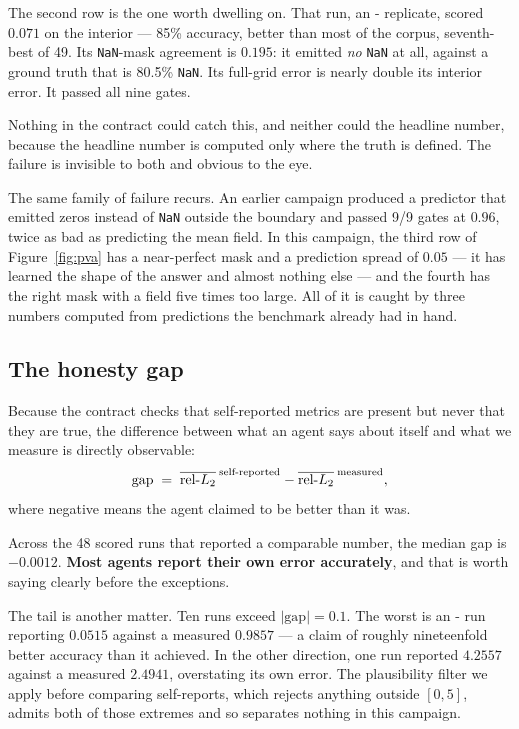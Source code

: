 The second row is the one worth dwelling on. That run, an \Lthree{}-
replicate, scored \relltwo{} $0.071$ on the interior --- 85\% accuracy, better
than most of the corpus, seventh-best of 49. Its \texttt{NaN}-mask agreement is
$0.195$: it emitted \emph{no} \texttt{NaN} at all, against a ground truth that
is 80.5\% \texttt{NaN}. Its full-grid error is nearly double its interior
error. It passed all nine gates.

Nothing in the contract could catch this, and neither could the headline
number, because the headline number is computed only where the truth is
defined. The failure is invisible to both and obvious to the eye.

The same family of failure recurs. An earlier campaign produced a predictor
that emitted zeros instead of \texttt{NaN} outside the boundary and passed 9/9
gates at \relltwo{} $0.96$, twice as bad as predicting the mean field. In this
campaign, the third row of Figure~\ref{fig:pva} has a near-perfect mask and a
prediction spread of $0.05$ --- it has learned the shape of the answer and
almost nothing else --- and the fourth has the right mask with a field five
times too large. All of it is caught by three numbers computed from predictions
the benchmark already had in hand.

\subsection{The honesty gap}
\label{sec:honesty}

Because the contract checks that self-reported metrics are present but never
that they are true, the difference between what an agent says about itself and
what we measure is directly observable:
\begin{equation}
  \mathrm{gap} \;=\;
  \overline{\mbox{rel-$L_2$}}^{\;\text{self-reported}} -
  \overline{\mbox{rel-$L_2$}}^{\;\text{measured}},
\end{equation}
where negative means the agent claimed to be better than it was.

Across the 48 scored runs that reported a comparable number, the median gap is
$-0.0012$. \textbf{Most agents report their own error accurately}, and that is
worth saying clearly before the exceptions.

The tail is another matter. Ten runs exceed $|\mathrm{gap}| = 0.1$. The worst
is an \Ltwo{}- run reporting $0.0515$ against a measured $0.9857$ --- a
claim of roughly nineteenfold better accuracy than it achieved. In the other
direction, one run reported $4.2557$ against a measured $2.4941$, overstating
its own error. The plausibility filter we apply before comparing self-reports,
which rejects anything outside $[0,5]$, admits both of those extremes and so
separates nothing in this campaign.

